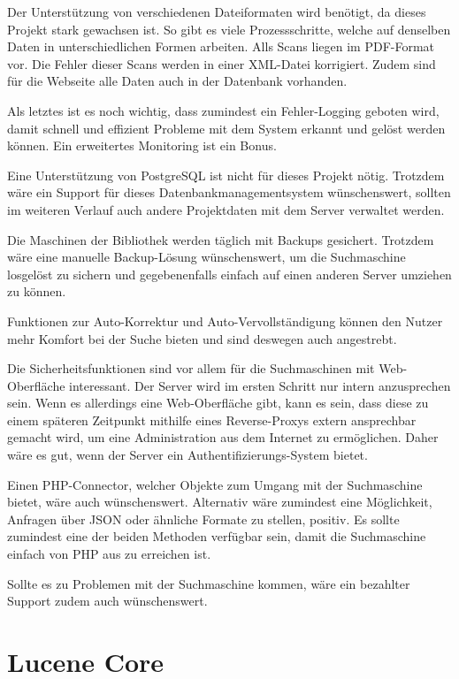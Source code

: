 Der Unterstützung von verschiedenen Dateiformaten wird benötigt, da dieses Projekt stark gewachsen ist. So gibt es viele Prozessschritte, welche auf denselben Daten in unterschiedlichen Formen arbeiten. Alls Scans liegen im PDF-Format vor. Die Fehler dieser Scans werden in einer XML-Datei korrigiert. Zudem sind für die Webseite alle Daten auch in der Datenbank vorhanden.

Als letztes ist es noch wichtig, dass zumindest ein Fehler-Logging geboten wird, damit schnell und effizient Probleme mit dem System erkannt und gelöst werden können. Ein erweitertes Monitoring ist ein Bonus.

Eine Unterstützung von PostgreSQL ist nicht für dieses Projekt nötig. Trotzdem wäre ein Support für dieses Datenbankmanagementsystem wünschenswert, sollten im weiteren Verlauf auch andere Projektdaten mit dem Server verwaltet werden. 

Die Maschinen der Bibliothek werden täglich mit Backups gesichert. Trotzdem wäre eine manuelle Backup-Lösung wünschenswert, um die Suchmaschine losgelöst zu sichern und gegebenenfalls einfach auf einen anderen Server umziehen zu können. 

Funktionen zur Auto-Korrektur und Auto-Vervollständigung können den Nutzer mehr Komfort bei der Suche bieten und sind deswegen auch angestrebt.

Die Sicherheitsfunktionen sind vor allem für die Suchmaschinen mit Web-Oberfläche interessant. Der Server wird im ersten Schritt nur intern anzusprechen sein. Wenn es allerdings eine Web-Oberfläche gibt, kann es sein, dass diese zu einem späteren Zeitpunkt mithilfe eines Reverse-Proxys extern ansprechbar gemacht wird, um eine Administration aus dem Internet zu ermöglichen. Daher wäre es gut, wenn der Server ein Authentifizierungs-System bietet.

Einen PHP-Connector, welcher Objekte zum Umgang mit der Suchmaschine bietet, wäre auch wünschenswert. Alternativ wäre zumindest eine Möglichkeit, Anfragen über JSON oder ähnliche Formate zu stellen, positiv. Es sollte zumindest eine der beiden Methoden verfügbar sein, damit die Suchmaschine einfach von PHP aus zu erreichen ist.

Sollte es zu Problemen mit der Suchmaschine kommen, wäre ein bezahlter Support zudem auch wünschenswert.

\section{Lucene Core}
\label{lucenecore}

